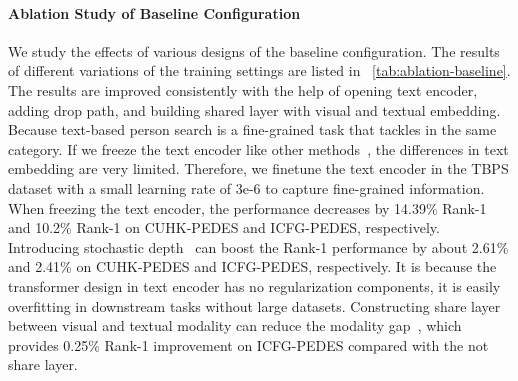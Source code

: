 \paragraph{Ablation Study of Baseline Configuration}
We study the effects of various designs of the baseline configuration. 
The results of different variations of the training settings are listed in \tablename~\ref{tab:ablation-baseline}. 
The results are improved consistently with the help of opening text encoder, adding drop path, and building shared layer with visual and textual embedding.
Because text-based person search is a fine-grained task that tackles in the same category. If we freeze the text encoder like other methods~\cite{textreid}, the differences in text embedding are very limited. Therefore, we finetune the text encoder in the TBPS dataset with a small learning rate of 3e-6 to capture fine-grained information. When freezing the text encoder, the performance decreases by 14.39\% Rank-1 and 10.2\% Rank-1 on CUHK-PEDES and ICFG-PEDES, respectively.
Introducing stochastic depth~\cite{stoc_depth} can boost the Rank-1 performance by about 2.61\% and 2.41\% on CUHK-PEDES and ICFG-PEDES, respectively. It is because the transformer design in text encoder has no regularization components, it is easily overfitting in downstream tasks without large datasets.
Constructing share layer between visual and textual modality can reduce the modality gap~\cite{zheng2020dual,ssan}, which provides 0.25\% Rank-1 improvement on ICFG-PEDES compared with the not share layer.

\begin{table}[t]
\renewcommand\arraystretch{1.06}
	\centering
		\caption{\small{Effects of different baseline network configuration on CUHK-PEDES and ICFG-PEDES datasets. The abbreviations O, D, S denote opening text encoder, stochastic depth~\cite{stoc_depth} and share layer between visual and textual modality, respectively.}}

	\label{tab:ablation-baseline}
\end{table}
